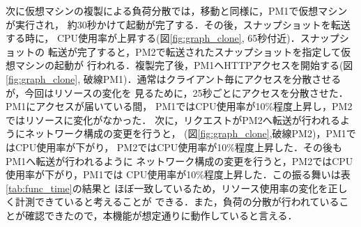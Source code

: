 \documentclass[submit,techrep]{ipsj}
\begin{document}
次に仮想マシンの複製による負荷分散では，移動と同様に，PM1で仮想マシンが実行され，
約30秒かけて起動が完了する．その後，スナップショットを転送する時に，
CPU使用率が上昇する(図\ref{fig:graph_clone}, 65秒付近)．スナップショットの
転送が完了すると，PM2で転送されたスナップショットを指定して仮想マシンの起動が
行われる．複製完了後，PM1へHTTPアクセスを開始する(図\ref{fig:graph_clone},
破線PM1)．通常はクライアント毎にアクセスを分散させるが，今回はリソースの変化を
見るために，25秒ごとにアクセスを分散させた．PM1にアクセスが届いている間，
PM1ではCPU使用率が10\%程度上昇し，PM2ではリソースに変化がなかった．
次に，リクエストがPM2へ転送が行われるようにネットワーク構成の変更を行うと，
(図\ref{fig:graph_clone},破線PM2)，PM1ではCPU使用率が下がり，
PM2ではCPU使用率が10\%程度上昇した．その後もPM1へ転送が行われるように
ネットワーク構成の変更を行うと，PM2ではCPU使用率が下がり，PM1では
CPU使用率が10\%程度上昇した．この振る舞いは表\ref{tab:func_time}の結果と
ほぼ一致しているため，リソース使用率の変化を正しく計測できていると考えることが
できる．また，負荷の分散が行われていることが確認できたので，本機能が想定通りに動作していると言える．
\end{document}
